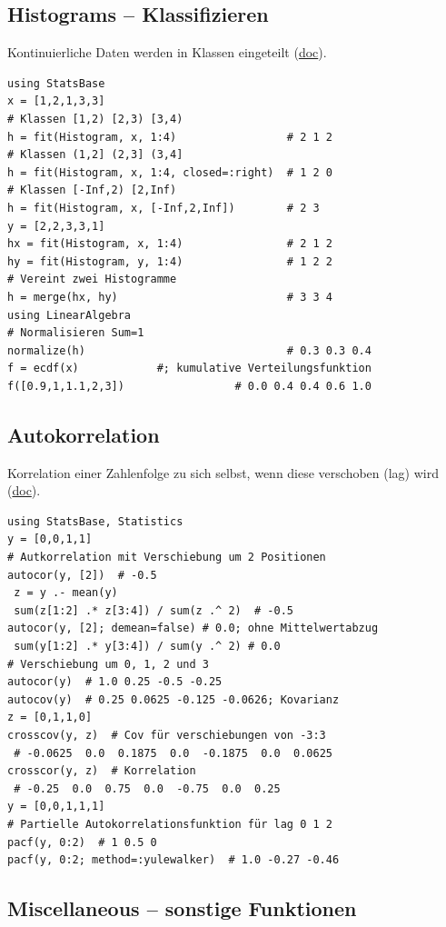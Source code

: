 \documentclass[10pt,twocolumn]{scrartcl}
\begin{document}
\subsection{Histograms -- Klassifizieren}

Kontinuierliche Daten werden in Klassen eingeteilt
(\href{https://juliastats.org/StatsBase.jl/stable/empirical/}{doc}).

\begin{lstlisting}
using StatsBase
x = [1,2,1,3,3]
# Klassen [1,2) [2,3) [3,4)
h = fit(Histogram, x, 1:4)                 # 2 1 2
# Klassen (1,2] (2,3] (3,4]
h = fit(Histogram, x, 1:4, closed=:right)  # 1 2 0
# Klassen [-Inf,2) [2,Inf)
h = fit(Histogram, x, [-Inf,2,Inf])        # 2 3
y = [2,2,3,3,1]
hx = fit(Histogram, x, 1:4)                # 2 1 2
hy = fit(Histogram, y, 1:4)                # 1 2 2
# Vereint zwei Histogramme
h = merge(hx, hy)                          # 3 3 4
using LinearAlgebra
# Normalisieren Sum=1
normalize(h)                               # 0.3 0.3 0.4
f = ecdf(x)            #; kumulative Verteilungsfunktion
f([0.9,1,1.1,2,3])                 # 0.0 0.4 0.4 0.6 1.0
\end{lstlisting}

\subsection{Autokorrelation}

Korrelation einer Zahlenfolge zu sich selbst, wenn diese verschoben (lag) wird
(\href{https://juliastats.org/StatsBase.jl/stable/signalcorr/}{doc}).

\begin{lstlisting}
using StatsBase, Statistics
y = [0,0,1,1]
# Autkorrelation mit Verschiebung um 2 Positionen
autocor(y, [2])  # -0.5
 z = y .- mean(y)
 sum(z[1:2] .* z[3:4]) / sum(z .^ 2)  # -0.5
autocor(y, [2]; demean=false) # 0.0; ohne Mittelwertabzug
 sum(y[1:2] .* y[3:4]) / sum(y .^ 2) # 0.0
# Verschiebung um 0, 1, 2 und 3
autocor(y)  # 1.0 0.25 -0.5 -0.25
autocov(y)  # 0.25 0.0625 -0.125 -0.0626; Kovarianz
z = [0,1,1,0]
crosscov(y, z)  # Cov für verschiebungen von -3:3
 # -0.0625  0.0  0.1875  0.0  -0.1875  0.0  0.0625
crosscor(y, z)  # Korrelation
 # -0.25  0.0  0.75  0.0  -0.75  0.0  0.25
y = [0,0,1,1,1]
# Partielle Autokorrelationsfunktion für lag 0 1 2
pacf(y, 0:2)  # 1 0.5 0
pacf(y, 0:2; method=:yulewalker)  # 1.0 -0.27 -0.46
\end{lstlisting}

\subsection{Miscellaneous -- sonstige Funktionen}
\end{document}
